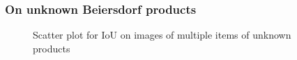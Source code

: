 \subsubsection{On unknown Beiersdorf products}\label{subsec:resunknownprod}
\begin{figure}[h]
 \centering
 \hfill
 \caption{Scatter plot for IoU on images of multiple items of unknown products}
 \label{figure: unknownproducts}
\end{figure}

